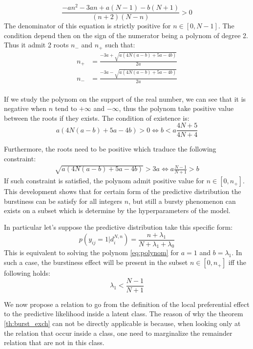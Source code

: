 \begin{equation} \label{eq:polynom}
\frac{-an^2 -3an +a(N-1)-b(N+1)}{(n+2)(N-n)} > 0 
\end{equation}
The denominator of this equation is strictly positive for $n \in [0, N-1]$. The condition depend then on the sign of the numerator being a polynom of degree 2. Thus it admit 2 roots $n_-$ and $n_+$ such that:
\begin{align}
n_+ &= \frac{-3a + \sqrt{a(4N(a-b)+5a-4b)}}{2a} \\
n_- &= \frac{-3a - \sqrt{a(4N(a-b)+5a-4b)}}{2a} \\
\end{align}

If we study the polynom on the support of the real number, we can see that it is negative when $n$ tend to $+\infty$ and $-\infty$, thus the polynom take positive value between the roots if they exists. The condition of existence is:
\begin{equation}
a(4N(a-b)+5a-4b) > 0 \iff b < a \frac{4N+5}{4N+4}
\end{equation}

Furthermore, the roots need to be positive which traduce the following constraint:
\begin{align}
\sqrt{a(4N(a-b)+5a-4b)} > 3a \iff a\frac{N-1}{N+1} > b
\end{align}
If such constraint is satisfied, the polynom admit positive value for $n \in [0, n_+]$. This development shows that for certain form of the predictive distribution the burstiness can be satisfy for all integers $n$, but still a bursty phenomenon can exists on a subset which is determine by the hyperparameters of the model.

In particular let's suppose the predictive distribution take this specific form:
\begin{equation}
p(y_{ij}=1 | d_i^{N,n}) = \frac{n+\lambda_1}{N+\lambda_1+\lambda_0}
\end{equation}
This is equivalent to solving the polynom \eqref{eq:polynom} for $a=1$ and $b=\lambda_1$. In such a case, the burstiness effect will be present in the subset $n \in [0, n_+]$ iff the following holds:
\begin{equation}
\lambda_1 < \frac{N-1}{N+1}
\end{equation}

We now propose a relation to go from the definition of the local preferential effect to the predictive likelihood inside a latent class. The reason of why the theorem \ref{th:burst_exch} can not be directly applicable is because, when looking only at the relation that occur inside a class, one need to marginalize the remainder relation that are not in this class.

